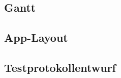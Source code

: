 \newpage
\subsection{Gantt}
\begin{landscape}
	
\end{landscape}

\subsection{App-Layout}
\label{subsec:App-Layout}
	
	
\subsection{Testprotokollentwurf}
\label{subsec:Testprotokollentwurf}
	
	





